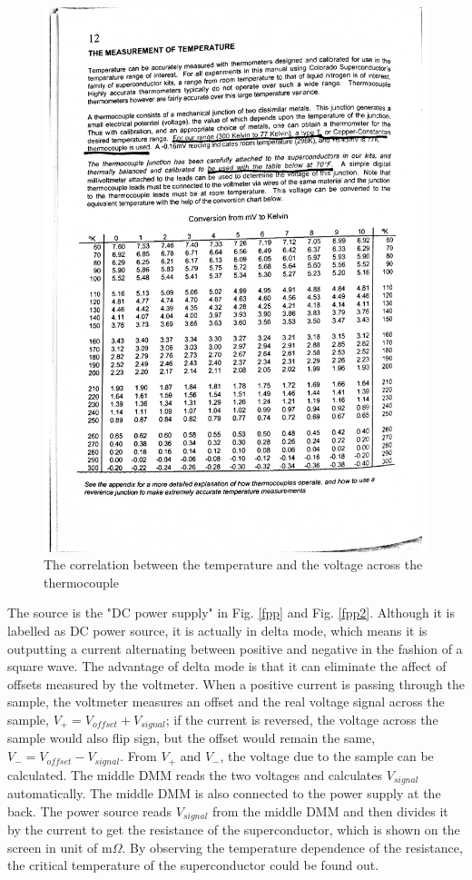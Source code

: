 \documentclass[prb,preprint]{revtex4-1}
\begin{document}
\begin{figure}[h]
\centering
\includegraphics[width=14cm]{temperature.pdf}
\caption{The correlation between the temperature and the voltage across the thermocouple \cite{thermocouple}}
\label{temp}
\end{figure}

The source is the "DC power supply" in Fig. \ref{fpp} and Fig. \ref{fpp2}. Although it is labelled as DC power source, it is actually in delta mode, which means it is outputting a current alternating between positive and negative in the fashion of a square wave. The advantage of delta mode is that it can eliminate the affect of offsets measured by the voltmeter. When a positive current is passing through the sample, the voltmeter measures an offset and the real voltage signal across the sample, $V_{+}=V_{offset}+V_{signal}$; if the current is reversed, the voltage across the sample would also flip sign, but the offset would remain the same, $V_{-}=V_{offset}-V_{signal}$. From $V_{+}$ and $V_{-}$, the voltage due to the sample can be calculated. The middle DMM reads the two voltages and calculates $V_{signal}$ automatically. The middle DMM is also connected to the power supply at the back. The power source reads $V_{signal}$ from the middle DMM and then divides it by the current to get the resistance of the superconductor, which is shown on the screen in unit of m$\Omega$. By observing the temperature dependence of the resistance, the critical temperature of the superconductor could be found out. \\
\end{document}
